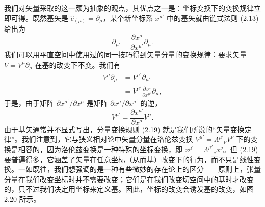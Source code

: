 我们对矢量采取的这一颇为抽象的观点，其优点之一是：坐标变换下的变换规律立即可得。既然基矢是 $\hat{e}_{(\mu)}=\partial_\mu$，某个新坐标系 $x^{\mu'}$ 中的基矢就由链式法则 (2.13) 给出为
\begin{equation*}
\partial_{\mu'}=\frac{\partial x^\mu}{\partial x^{\mu'}}\partial_\mu. \tag{2.17}
\end{equation*}
我们可以用平直空间中使用过的同一技巧得到矢量分量的变换规律：要求矢量 $V=V^\mu\partial_\mu$ 在基的改变下不变。我们有
\begin{align*}
V^\mu\partial_\mu&=V^{\mu'}\partial_{\mu'}\\
&=V^{\mu'}\frac{\partial x^\mu}{\partial x^{\mu'}}\partial_\mu, \tag{2.18}
\end{align*}
于是，由于矩阵 $\partial x^{\mu'}/\partial x^\mu$ 是矩阵 $\partial x^\mu/\partial x^{\mu'}$ 的逆，
\begin{equation*}
V^{\mu'}=\frac{\partial x^{\mu'}}{\partial x^\mu}V^\mu. \tag{2.19}
\end{equation*}
由于基矢通常并不显式写出，分量变换规则 (2.19) 就是我们所说的“矢量变换定律”。我们注意到，它与狭义相对论中矢量分量在洛伦兹变换 $V^{\mu'}=\Lambda^{\mu'}{}_\nu V^\nu$ 下的变换是相容的，因为洛伦兹变换是一种特殊的坐标变换，即 $x^{\mu'}=\Lambda^{\mu'}{}_\nu x^\nu$。但 (2.19) 要普遍得多，它涵盖了矢量在任意坐标（从而基）改变下的行为，而不只是线性变换。一如既往，我们想强调的是一种有些微妙的存在论上的区分——原则上，张量分量在我们改变坐标时并不需要改变；它们是在我们改变切空间中的基时才改变的，只不过我们决定用坐标来定义基。因此，坐标的改变会诱发基的改变，如图 2.20 所示。

